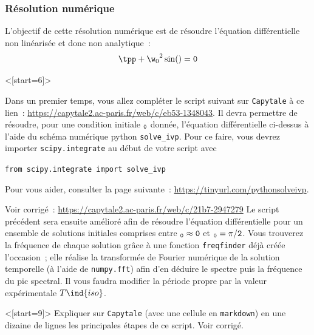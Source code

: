 \documentclass[../main/main.tex]{subfiles}
\begin{document}

\subsubsection{Résolution numérique}

L'objectif de cette résolution numérique est de résoudre l'équation
différentielle non linéarisée et donc non analytique~:
\[
	\tpp + {\w_0}^2 \sin(\tt) = 0
\]

\QR<[start=6]>{%
	Dans un premier temps, vous allez compléter le script suivant sur
	\texttt{Capytale} à ce lien~:
	\url{https://capytale2.ac-paris.fr/web/c/eb53-1348043}. Il devra
	permettre de résoudre, pour une condition initiale $\tt_0$ donnée,
	l'équation différentielle ci-dessus à l'aide du schéma numérique python
	\texttt{solve\_ivp}. Pour ce faire, vous devrez importer
	\texttt{scipy.integrate} au début de votre script avec
	\begin{center}
		\texttt{from scipy.integrate import solve\_ivp}
	\end{center}
	Pour vous aider, consulter la page suivante~:
	\url{https://tinyurl.com/pythonsolveivp}.
}{%
	Voir corrigé~: \url{https://capytale2.ac-paris.fr/web/c/21b7-2947279}
}
Le script précédent sera ensuite amélioré afin de résoudre l'équation
différentielle pour un ensemble de solutions initiales comprises entre
$\tt_0 \approx 0$ et $\tt_0 = \pi/2$. Vous trouverez la fréquence de
chaque solution grâce à une fonction \texttt{freqfinder} déjà créée
l'occasion~; elle réalise la transformée de Fourier numérique de
la solution temporelle (à l'aide de \texttt{numpy.fft}) afin d'en
déduire le spectre puis la fréquence du pic spectral. Il vous faudra
modifier la période propre par la valeur expérimentale $T\ind{iso}$.
\bigskip

\QR<[start=9]>{%
	Expliquer sur \texttt{Capytale} (avec une cellule en
	\texttt{markdown}) en une dizaine de lignes les principales étapes de ce
	script.
}{%
	Voir corrigé.
}




\end{document}
